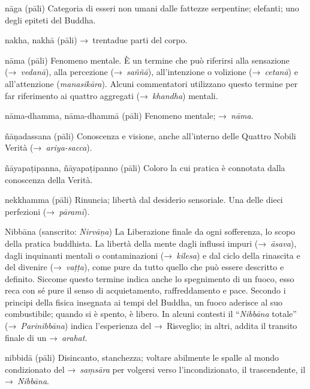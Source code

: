 \begin{glossarydescription}

\item[nāga] (pāli) Categoria di esseri non umani dalle fattezze serpentine;
  elefanti; uno degli epiteti del Buddha.

\item[nakha, nakhā] (pāli) →~trentadue parti del corpo.

\item[nāma] (pāli) Fenomeno mentale. È un termine che può riferirsi alla
  sensazione (→~\emph{vedanā}), alla percezione (→~\emph{saññā}), all'intenzione
  o volizione (→~\emph{cetanā}) e all'attenzione (\emph{manasikāra}). Alcuni
  commentatori utilizzano questo termine per far riferimento ai quattro
  aggregati (→~\emph{khandha}) mentali.

\item[nāma-dhamma, nāma-dhammā] (pāli) Fenomeno mentale; →~\emph{nāma}.

\item[ñāṇadassana] (pāli) Conoscenza e visione, anche all'interno delle Quattro
  Nobili Verità (→~\emph{ariya-sacca}).

\item[ñāyapaṭipanna, ñāyapaṭipanno] (pāli) Coloro la cui pratica è connotata
  dalla conoscenza della Verità.

\item[nekkhamma] (pāli) Rinuncia; libertà dal desiderio sensoriale. Una delle
  dieci perfezioni (→~\emph{pāramī}).

\item[Nibbāna] (sanscrito: \emph{Nirvāṇa}) La Liberazione finale da ogni
  sofferenza, lo scopo della pratica buddhista. La libertà della mente dagli
  influssi impuri (→~\emph{āsava}), dagli inquinanti mentali o contaminazioni
  (→~\emph{kilesa}) e dal ciclo della rinascita e del divenire (→~\emph{vaṭṭa}),
  come pure da tutto quello che può essere descritto e definito. Siccome questo
  termine indica anche lo spegnimento di un fuoco, esso reca con sé pure il
  senso di acquietamento, raffreddamento e pace. Secondo i principi della fisica
  insegnata ai tempi del Buddha, un fuoco aderisce al suo combustibile; quando
  si è spento, è libero. In alcuni contesti il ``\emph{Nibbāna} totale''
  (→~\emph{Parinibbāna}) indica l'esperienza del →~Risveglio; in altri, addita
  il transito finale di un →~\emph{arahat}.

\item[nibbidā] (pāli) Disincanto, stanchezza; voltare abilmente le spalle al
  mondo condizionato del →~\emph{saṃsāra} per volgersi verso l'incondizionato,
  il trascendente, il →~\emph{Nibbāna}.


\end{glossarydescription}
